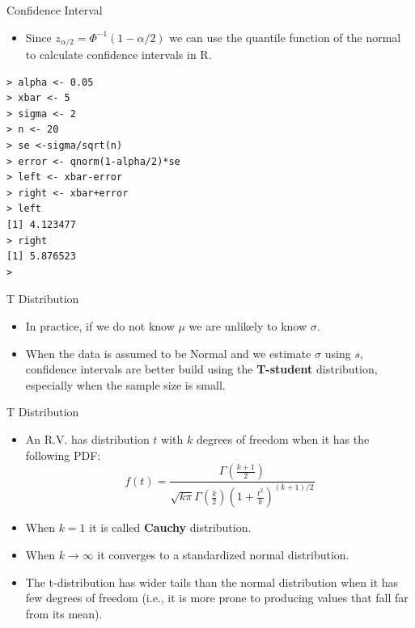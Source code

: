 \documentclass[handout]{beamer}
\begin{document}
\begin{frame}[fragile]{Confidence Interval}

\scriptsize{
\begin{itemize}
 \item Since $z_{\alpha/2} = \Phi^{-1}(1-\alpha/2)$ we can use the quantile function of the normal to calculate confidence intervals in R.
\end{itemize}


\begin{verbatim}
> alpha <- 0.05
> xbar <- 5
> sigma <- 2
> n <- 20
> se <-sigma/sqrt(n)
> error <- qnorm(1-alpha/2)*se
> left <- xbar-error
> right <- xbar+error
> left
[1] 4.123477
> right
[1] 5.876523
>
\end{verbatim}
}



\end{frame}

\begin{frame}{T Distribution}
\scriptsize{
\begin{itemize}
 \item In practice, if we do not know $\mu$ we are unlikely to know $\sigma$.
 \item When the data is assumed to be Normal and we estimate $\sigma$ using $s$, confidence intervals are better build using the \textbf{T-student} distribution, especially when the sample size is small.
\end{itemize}

\begin{block}{T Distribution}
\begin{itemize}
 \item An R.V. has distribution $t$ with $k$ degrees of freedom when it has the following PDF:
\begin{displaymath}
 f(t)=\frac{\Gamma(\frac{k+1}{2})}{\sqrt{k\pi}\Gamma(\frac k2)(1+\frac{t^2}{k})^{(k+1)/2}}
\end{displaymath}
\item  When $k=1$ it is called \textbf{Cauchy} distribution.
\item When $k\rightarrow \infty$ it converges to a standardized normal distribution.
 \item The t-distribution has wider tails than the normal distribution when it has few degrees of freedom (i.e.,  it is more prone to producing values that fall far from its mean).


\end{itemize}

 
\end{block}


} 
\end{frame}
\end{document}
